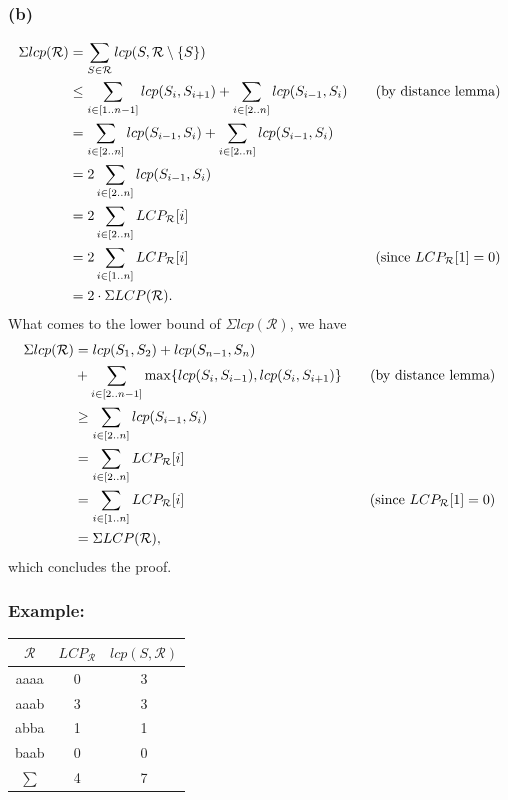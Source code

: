 \documentclass[10pt]{article}
\begin{document}
\subsubsection*{(b)}
\begin{align*}
\Sigma lcp(\mathcal{R}) &= \sum_{S \in \mathcal{R}} lcp(S, \mathcal{R} \setminus \{ S \}) \\
									  &\leq \sum_{i \in [1 .. n - 1]} lcp(S_i, S_{i + 1}) + \sum_{i \in [2 .. n]} lcp(S_{i - 1}, S_i) &\text{\quad (by distance lemma)} \\
									  &= \sum_{i \in [2 .. n]} lcp(S_{i - 1}, S_i) + \sum_{i \in [2 .. n]} lcp(S_{i - 1}, S_i) \\
									  &= 2 \sum_{i \in [2 .. n]} lcp(S_{i - 1}, S_i) \\
									  &= 2 \sum_{i \in [2 .. n]} LCP_{\mathcal{R}}[i] \\
									  &= 2 \sum_{i \in [1 .. n]} LCP_{\mathcal{R}}[i] & \text{\quad (since } LCP_{\mathcal{R}}[1] = 0) \\
									  &= 2 \cdot \Sigma LCP(\mathcal{R}).
\end{align*}
What comes to the lower bound of $\Sigma lcp(\mathcal{R})$, we have
\begin{align*}
\Sigma lcp(\mathcal{R}) &= lcp(S_1, S_2) + lcp(S_{n - 1}, S_n) \\
 									  &+ \sum_{i \in [2 .. n - 1]} \max \{ lcp(S_i, S_{i - 1}), lcp(S_i, S_{i + 1}) \} &\text{\quad (by distance lemma)} \\
    								  &\geq \sum_{i \in [2 .. n]} lcp(S_{i - 1}, S_i) \\
    								  &= \sum_{i \in [2 .. n]} LCP_{\mathcal{R}}[i] \\
    								  &= \sum_{i \in [1 .. n]} LCP_{\mathcal{R}}[i] & \text{\quad (since } LCP_{\mathcal{R}}[1] = 0) \\
    								  &= \Sigma LCP(\mathcal{R}),
\end{align*}
which concludes the proof.

\subsubsection*{Example:}
\begin{tabular}{|c|c|c|}
\hline
$\mathcal{R}$ & $LCP_{\mathcal{R}}$ & $lcp(S, \mathcal{R})$ \\
\hline
aaaa & 0 & 3 \\
aaab & 3 & 3 \\
abba & 1 & 1 \\
baab & 0 & 0 \\
\hline
$\sum$ & 4 & 7 \\
\hline
\end{tabular}
\end{document}
